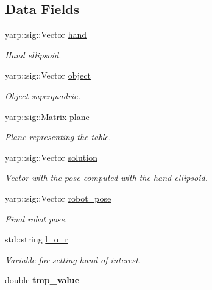 \subsection*{Data Fields}
\begin{DoxyCompactItemize}
\item 
yarp\+::sig\+::\+Vector \hyperlink{classgrasping__NLP_abdf5321a362b6b73b54271d81e8cdd17}{hand}\label{classgrasping__NLP_abdf5321a362b6b73b54271d81e8cdd17}

\begin{DoxyCompactList}\small\item\em Hand ellipsoid. \end{DoxyCompactList}\item 
yarp\+::sig\+::\+Vector \hyperlink{classgrasping__NLP_aa9ee2758debcf6e9d06cf904394fb2df}{object}\label{classgrasping__NLP_aa9ee2758debcf6e9d06cf904394fb2df}

\begin{DoxyCompactList}\small\item\em Object superquadric. \end{DoxyCompactList}\item 
yarp\+::sig\+::\+Matrix \hyperlink{classgrasping__NLP_a64e8645d3e469a6d3d532fdccd082fcc}{plane}\label{classgrasping__NLP_a64e8645d3e469a6d3d532fdccd082fcc}

\begin{DoxyCompactList}\small\item\em Plane representing the table. \end{DoxyCompactList}\item 
yarp\+::sig\+::\+Vector \hyperlink{classgrasping__NLP_a331e541566751ac8cb85016d6878cc73}{solution}\label{classgrasping__NLP_a331e541566751ac8cb85016d6878cc73}

\begin{DoxyCompactList}\small\item\em Vector with the pose computed with the hand ellipsoid. \end{DoxyCompactList}\item 
yarp\+::sig\+::\+Vector \hyperlink{classgrasping__NLP_afe0fc80111d346ef60e17fc4c52439c9}{robot\+\_\+pose}\label{classgrasping__NLP_afe0fc80111d346ef60e17fc4c52439c9}

\begin{DoxyCompactList}\small\item\em Final robot pose. \end{DoxyCompactList}\item 
std\+::string \hyperlink{classgrasping__NLP_a7528c5c50e79a6992d7a8af1221d0e7d}{l\+\_\+o\+\_\+r}\label{classgrasping__NLP_a7528c5c50e79a6992d7a8af1221d0e7d}

\begin{DoxyCompactList}\small\item\em Variable for setting hand of interest. \end{DoxyCompactList}\item 
double {\bfseries tmp\+\_\+value}\label{classgrasping__NLP_a7fe4c2cc412a8084f5a8aefd7b9bbc87}

\end{DoxyCompactItemize}


